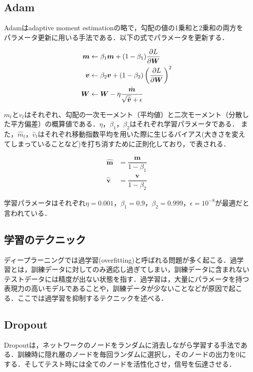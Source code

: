 \subsection*{Adam}
Adam\cite{Adam}はadaptive moment estimationの略で，勾配の値の1乗和と2乗和の両方をパラメータ更新に用いる手法である．以下の式でパラメータを更新する．

\begin{align}\label{eq:adam}
	\bm{m} & \leftarrow \beta_1 \bm{m} + (1 - \beta_1) \dfrac{\partial L}{\partial \bm{W}} \\
	\bm{v} & \leftarrow \beta_2 \bm{v} + (1 - \beta_2) \left( \dfrac{\partial L}{\partial \bm{W}} \right) ^2 \\
	\bm{W} & \leftarrow \bm{W} - \eta \dfrac{\hat{\bm{m}}}{\sqrt{\hat{\bm{v}}} + \epsilon} 
\end{align}

$m_t$と$v_t$はそれぞれ、勾配の一次モーメント（平均値）と二次モーメント（分散した平方偏差）の概算値である．$\eta$，$\beta_1$，$\beta_2$はそれぞれ学習パラメータである．
また，$\hat{m}_t$，$\hat{v}_t$はそれぞれ移動指数平均を用いた際に生じるバイアス(大きさを変えてしまっていることなど)を打ち消すために正則化しており，で表される．

\begin{align}\label{eq:adamhat}
	\hat{\bm{m}} & = \dfrac{\bm{m}}{1 - \beta_1} \\
	\hat{\bm{v}} & = \dfrac{\bm{v}}{1 - \beta_2}
\end{align}

学習パラメータはそれぞれ$\eta = 0.001$，$\beta_1 = 0.9$，$\beta_2 = 0.999$，$\epsilon = 10^{-8}$が最適だと言われている\cite{Adam}．

\subsection{学習のテクニック}
ディープラーニングでは過学習(overfitting)と呼ばれる問題が多く起こる．過学習とは，訓練データに対してのみ適応し過ぎてしまい，訓練データに含まれないテストデータには精度が出ない状態を指す．過学習は，大量にパラメータを持つ表現力の高いモデルであることや，訓練データが少ないことなどが原因で起こる．ここでは過学習を抑制するテクニックを述べる．

\subsection*{Dropout}
Dropout\cite{Dropout}は，ネットワークのノードをランダムに消去しながら学習する手法である．訓練時に隠れ層のノードを毎回ランダムに選択し，そのノードの出力を0にする．そしてテスト時には全てのノードを活性化させ，信号を伝達させる．

